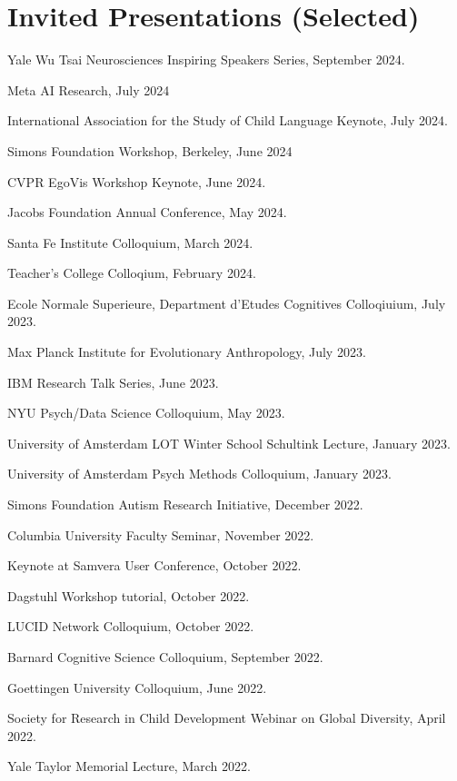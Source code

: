 \documentclass{article}
\renewenvironment{itemize}{
\begin{list}{}{
  \setlength{\leftmargin}{1.5em}
  }
  }{
\end{list}
}
\begin{document}
\section*{Invited Presentations (Selected)}

\begin{itemize}
  \item Yale Wu Tsai Neurosciences Inspiring Speakers Series, September 2024.
  \item Meta AI Research, July 2024
  \item International Association for the Study of Child Language Keynote, July 2024.
  \item Simons Foundation Workshop, Berkeley, June 2024
  \item CVPR EgoVis Workshop Keynote, June 2024.
  \item Jacobs Foundation Annual Conference, May 2024.
  \item Santa Fe Institute Colloquium, March 2024.
  \item Teacher's College Colloqium, February 2024.
  \item Ecole Normale Superieure, Department d'Etudes Cognitives Colloqiuium, July 2023.
  \item Max Planck Institute for Evolutionary Anthropology, July 2023.
  \item IBM Research Talk Series, June 2023.
  \item NYU Psych/Data Science Colloquium, May 2023.
  \item University of Amsterdam LOT Winter School Schultink Lecture, January 2023.
  \item University of Amsterdam Psych Methods Colloquium, January 2023.
  \item Simons Foundation Autism Research Initiative, December 2022.
  \item Columbia University Faculty Seminar, November 2022.
  \item Keynote at Samvera User Conference, October 2022.
  \item Dagstuhl Workshop tutorial, October 2022.
  \item LUCID Network Colloquium, October 2022.
  \item Barnard Cognitive Science Colloquium, September 2022.
  \item Goettingen University Colloquium, June 2022.
  \item Society for Research in Child Development Webinar on Global Diversity,
  April 2022.
  \item Yale Taylor Memorial Lecture, March 2022.

\end{itemize}
\end{document}

